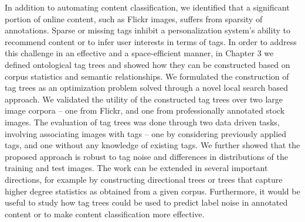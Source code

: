\documentclass[12pt]{ucsddissertation}
\begin{document}
In addition to automating content classification, we identified that a significant portion of online content, such as Flickr images, suffers from sparsity of annotations. Sparse or missing tags inhibit a personalization system's ability to recommend content or to infer user interests in terms of tags. 
In order to address this challenge in an effective and a space-efficient manner, in Chapter 3 we defined ontological tag trees and showed how they can be constructed based on corpus statistics and semantic relationships. We formulated the construction of tag trees as an optimization problem solved through a novel local search based approach. We validated the utility of the constructed tag trees over two large image corpora -- one from Flickr, and one from professionally annotated stock images. The evaluation of tag trees was done through two data driven tasks, involving associating images with tags -- one by considering previously applied tags, and one without any knowledge of existing tags. We further showed that the proposed approach is robust to tag noise and differences in distributions of the training and test images. The work can be extended in several important directions, for example by constructing directional trees or trees that capture higher degree statistics as obtained from a given corpus. Furthermore, it would be useful to study how tag trees could be used to predict label noise in annotated content or to make content classification more effective. 
\end{document}
